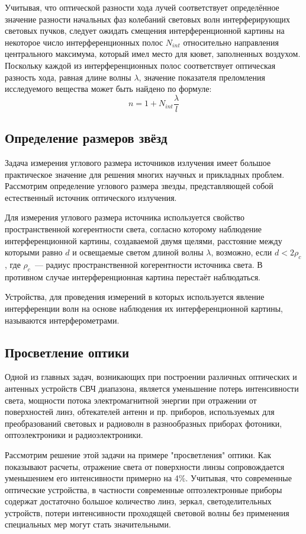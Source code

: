 \documentclass[a4paper, 12pt]{extarticle}
\begin{document}
  Учитывая, что оптической разности хода лучей соответствует определённое значение разности
  начальных фаз колебаний световых волн интерферирующих световых пучков, следует ожидать смещения
  интерференционной картины на некоторое число интерференционных полос $N_{int}$ относительно направления
  центрального максимума, который имел место для кювет, заполненных воздухом. Поскольку каждой из
  интерференционных полос соответствует оптическая разность хода, равная длине волны $\lambda$, значение
  показателя преломления исследуемого вещества может быть найдено по формуле:
    $$
      n = 1 + N_{int} \frac{\lambda}{l}
    $$

  \subsection{Определение размеров звёзд}
  Задача измерения углового размера источников излучения имеет большое практическое значение для решения многих научных и прикладных проблем. Рассмотрим определение углового размера звезды, представляющей собой естественный источник оптического излучения.

  Для измерения углового размера источника используется свойство пространственной когерентности света, согласно которому
  наблюдение интерференционной картины, создаваемой двумя щелями, расстояние между которыми
  равно $d$ и освещаемые светом длиной волны $\lambda$, возможно, если $d < 2 \rho_c$, где
  $\rho_c$~--- радиус пространственной когерентности источника света. В противном случае интерференционная картина перестаёт наблюдаться.

  Устройства, для проведения измерений в которых используется явление интерференции волн на основе наблюдения их интерференционной картины, называются интерферометрами.

  \subsection{Просветление оптики}
  Одной из главных задач, возникающих при построении различных оптических и антенных устройств СВЧ
  диапазона, является уменьшение потерь интенсивности света, мощности потока электромагнитной
  энергии при отражении от поверхностей линз, обтекателей антенн и пр. приборов, используемых для
  преобразований световых и радиоволн в разнообразных приборах фотоники, оптоэлектроники и
  радиоэлектроники.

  Рассмотрим решение этой задачи на примере "просветления" оптики. Как показывают расчеты, отражение
  света от поверхности линзы сопровождается уменьшением его интенсивности примерно на 4\%. Учитывая,
  что современные оптические устройства, в частности современные оптоэлектронные приборы содержат
  достаточно большое количество линз, зеркал, светоделительных устройств, потери интенсивности
  проходящей световой волны без применения специальных мер могут стать значительными.
\end{document}

